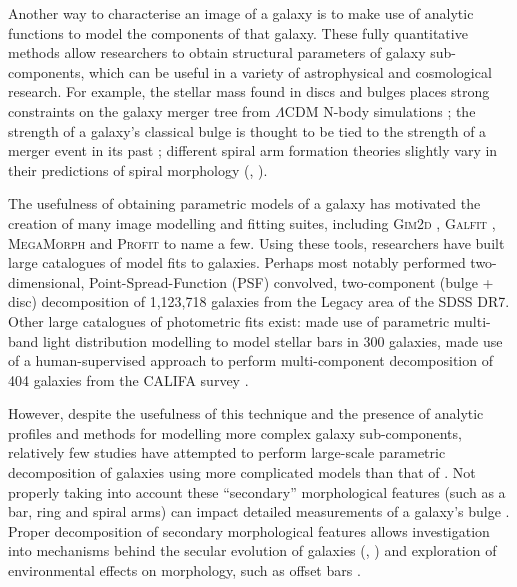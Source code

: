 \documentclass[../main.tex]{subfiles}
\begin{document}
Another way to characterise an image of a galaxy is to make use of analytic functions to model the components of that galaxy. These fully quantitative methods allow researchers to obtain structural parameters of galaxy sub-components, which can be useful in a variety of astrophysical and cosmological research. For example, the stellar mass found in discs and bulges places strong constraints on the galaxy merger tree from $\Lambda\mathrm{CDM}$ N-body simulations \citep{Hopkins2010:1004.2708v3}; the strength of a galaxy's classical bulge is thought to be tied to the strength of a merger event in its past \citep{Kormendy2010:1009.3015v1}; different spiral arm formation theories slightly vary in their predictions of spiral morphology (\citealt{Dobbs2014:1407.5062v1}, \citealt{Pour-Imani2016:1608.00969v1} \citealt{2017MNRAS.472.2263H}).

The usefulness of obtaining parametric models of a galaxy has motivated the creation of many image modelling and fitting suites, including \textsc{Gim2d} \citep{gim2d-paper}, \textsc{Galfit} \citep{galfit-paper}, \textsc{MegaMorph} \citep{megamorph-paper} and \textsc{Profit} \citep{profit-paper} to name a few. Using these tools, researchers have built large catalogues of model fits to galaxies. Perhaps most notably \citet{Simard2002:astro-ph/0205025v2} performed two-dimensional, Point-Spread-Function (PSF) convolved, two-component (bulge + disc) decomposition of 1,123,718 galaxies from the Legacy area of the SDSS DR7. Other large catalogues of photometric fits exist: \cite{Gadotti2010:1003.1719v2} made use of parametric multi-band light distribution modelling to model stellar bars in 300 galaxies, \cite{Mendez-Abreu2016:1610.05324v1} made use of a human-supervised approach to perform multi-component decomposition of 404 galaxies from the CALIFA survey \citep{Sanchez2011:1111.0962v2}.

However, despite the usefulness of this technique and the presence of analytic profiles and methods for modelling more complex galaxy sub-components, relatively few studies have attempted to perform large-scale parametric decomposition of galaxies using more complicated models than that of \citet{Simard2002:astro-ph/0205025v2}. Not properly taking into account these ``secondary'' morphological features (such as a bar, ring and spiral arms) can impact detailed measurements of a galaxy's bulge \citep{Gao2017:1709.00746v1}. Proper decomposition of secondary morphological features allows investigation into mechanisms behind the secular evolution of galaxies (\citealt{2018MNRAS.473.4731K}, \citealt{2018ApJ...862..100G}) and exploration of environmental effects on morphology, such as offset bars \citep{2017MNRAS.469.3363K}.
\end{document}
